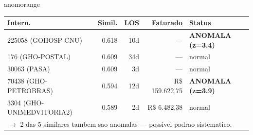 \documentclass[a4paper,10pt]{article}
\begin{document}
\begin{anomalycard}[Internacao 184210 | PASA | ALTO (z=3.03)]{anomorange}
\begin{tabular}{l r r r l}\toprule\textbf{Intern.} & \textbf{Simil.} & \textbf{LOS} & \textbf{Faturado} & \textbf{Status} \\\midrule
225058 (GOHOSP-CNU) & 0.618 & 10d & --- & \textcolor{anomred}{\textbf{ANOMALA (z=3.4)}} \\
176 (GHO-POSTAL) & 0.609 & 34d & --- & \textcolor{jcubeblue}{normal} \\
30063 (PASA) & 0.609 & 3d & --- & \textcolor{jcubeblue}{normal} \\
70438 (GHO-PETROBRAS) & 0.594 & 12d & R\$ 159.622,75 & \textcolor{anomred}{\textbf{ANOMALA (z=3.9)}} \\
3304 (GHO-UNIMEDVITORIA2) & 0.589 & 2d & R\$ 6.482,38 & \textcolor{jcubeblue}{normal} \\
\multicolumn{5}{l}{\textcolor{anomred}{\small $\rightarrow$ 2 das 5 similares tambem sao anomalas --- possivel padrao sistematico.}} \\
\bottomrule\end{tabular}


\end{anomalycard}

\newpage
\end{document}
